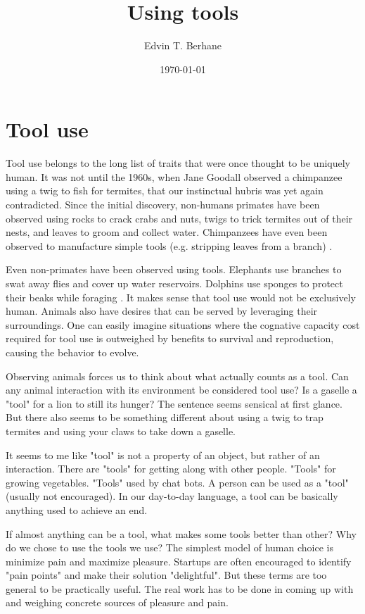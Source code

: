 \documentclass[12pt]{article}  %
\title{Using tools}
\author{Edvin T. Berhane}
\date{\today}
\begin{document}
\section*{Tool use}

Tool use belongs to the long list of traits that were once thought to be uniquely human. It was not until the 1960s, when Jane Goodall observed a chimpanzee using a twig to fish for termites, that our instinctual hubris was yet again contradicted. Since the initial discovery, non-humans primates have been observed using rocks to crack crabs and nuts, twigs to trick termites out of their nests, and leaves to groom and collect water\cite{jg_chimp_tool_use}. Chimpanzees have even been observed to manufacture simple tools (e.g. stripping leaves from a branch) \cite{boesch_chimpanzees_2000}.

Even non-primates have been observed using tools. Elephants use branches to swat away flies and cover up water reservoirs. Dolphins use sponges to protect their beaks while foraging \cite{wiki_tool_use}. It makes sense that tool use would not be exclusively human. Animals also have desires that can be served by leveraging their surroundings. One can easily imagine situations where the cognative capacity cost required for tool use is outweighed by benefits to survival and reproduction, causing the behavior to evolve.

Observing animals forces us to think about what actually counts as a tool. Can any animal interaction with its environment be considered tool use? Is a gaselle a "tool" for a lion to still its hunger? The sentence seems sensical at first glance. But there also seems to be something different about using a twig to trap termites and using your claws to take down a gaselle. 

It seems to me like "tool" is not a property of an object, but rather of an interaction. There are "tools" for getting along with other people. "Tools" for growing vegetables. "Tools" used by chat bots. A person can be used as a "tool" (usually not encouraged). In our day-to-day language, a tool can be basically anything used to achieve an end.

If almost anything can be a tool, what makes some tools better than other? Why do we chose to use the tools we use? The simplest model of human choice is minimize pain and maximize pleasure. Startups are often encouraged to identify "pain points" and make their solution "delightful". But these terms are too general to be practically useful. The real work has to be done in coming up with and weighing concrete sources of pleasure and pain.
\end{document}
